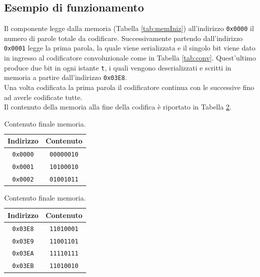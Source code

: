 \documentclass[fleqn,11pt]{article}
\begin{document}
\subsection{Esempio di funzionamento}
Il componente legge dalla memoria (Tabella \ref{tab:memIniz}) all'indirizzo \verb|0x0000| il numero di parole totale da codificare.
Successivamente partendo dall'indirizzo \verb|0x0001| legge la prima parola, la quale viene serializzata e il singolo bit viene dato in ingresso al codificatore convoluzionale come in Tabella \ref{tab:conv}.
Quest'ultimo produce due bit in ogni istante \verb|t|, i quali vengono deserializzati e scritti in memoria a partire dall'indirizzo \verb|0x03E8|.\\
Una volta codificata la prima parola il codificatore continua con le successive fino ad averle codificate tutte.\\
Il contenuto della memoria alla fine della codifica è riportato in Tabella \ref{tab:memFin}.\\

\begin{table}[h]
    \begin{minipage}{0.45\textwidth}
        \centering
        \begin{tabular}{|c|c|}
            \hline
            Indirizzo & Contenuto \\
            \hline
            \verb|0x0000| & \verb|00000010| \\ 
            \verb|0x0001| & \verb|10100010| \\ 
            \verb|0x0002| & \verb|01001011| \\ 
            \hline
        \end{tabular}
        \caption{Contenuto iniziale memoria.}
        \label{tab:memIniz}
    \end{minipage}
    \hfill
    \begin{minipage}{0.45\textwidth}
        \centering
        \begin{tabular}{|c|c|}
            \hline
            Indirizzo & Contenuto \\
            \hline
            \verb|0x03E8| & \verb|11010001| \\ 
            \verb|0x03E9| & \verb|11001101| \\ 
            \verb|0x03EA| & \verb|11110111| \\ 
            \verb|0x03EB| & \verb|11010010| \\ 
            \hline
        \end{tabular}
        \caption{Contenuto finale memoria.}
        \label{tab:memFin}
    \end{minipage}
\end{table}
\end{document}
